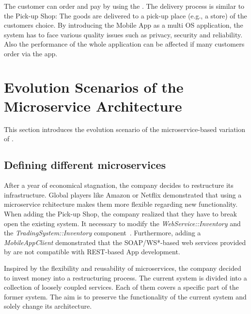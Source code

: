 The customer can order and pay by using the . 
The delivery process is similar to the Pick-up Shop: The goods are delivered to a pick-up place (e.g., a store) of the customers choice.
By introducing the Mobile App as a multi OS application, the \CoCoME system has to face various quality issues such as privacy, security and reliability. 
Also the performance of the whole application can be affected if many customers order via the app.





\section{Evolution Scenarios of the Microservice Architecture}
This section introduces the evolution scenario of the microservice-based variation of \CoCoME.
\subsection{Defining different microservices}
After a year of economical stagnation, the \CoCoME company decides to restructure its infrastructure. 
Global players like Amazon or Netflix demonstrated that using a microservice rchitecture makes them more flexible regarding new functionality. 
When adding the Pick-up Shop, the \CoCoME company realized that they have to break open the existing system. 
It  necessary to modify the \textit{WebService::Inventory} and the \textit{TradingSystem::Inventory} component~\cite{HeinrichRostamiReussner2016_1000052688}. 
Furthermore, adding a \textit{MobileAppClient} demonstrated that the SOAP/WS*-based web services provided by \CoCoME are not compatible with REST-based App development.

Inspired by the flexibility and reusability of microservices, the \CoCoME company decided to invest money into a restructuring process. 
The current system is divided into a collection of loosely coupled services. Each of them covers a specific part of the former \CoCoME system. 
The aim is to preserve the functionality of the current system and solely change its architecture.

